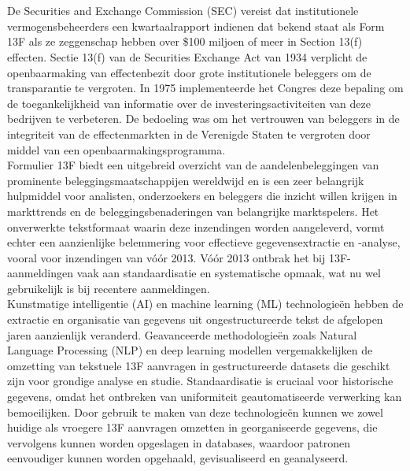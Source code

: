 \chapter{}%
\label{ch:stand-van-zaken}



De Securities and Exchange Commission (SEC) vereist dat institutionele vermogensbeheerders een kwartaalrapport indienen dat bekend staat als Form 13F als ze zeggenschap hebben over \$100 miljoen of meer in Section 13(f) effecten. Sectie 13(f) van de Securities Exchange Act van 1934 verplicht de openbaarmaking van effectenbezit door grote institutionele beleggers om de transparantie te vergroten. In 1975 implementeerde het Congres deze bepaling om de toegankelijkheid van informatie over de investeringsactiviteiten van deze bedrijven te verbeteren. De bedoeling was om het vertrouwen van beleggers in de integriteit van de effectenmarkten in de Verenigde Staten te vergroten door middel van een openbaarmakingsprogramma\autocite{SECform13F2024}.\\
Formulier 13F biedt een uitgebreid overzicht van de aandelenbeleggingen van prominente beleggingsmaatschappijen wereldwijd en is een zeer belangrijk hulpmiddel voor analisten, onderzoekers en beleggers die inzicht willen krijgen in markttrends en de beleggingsbenaderingen van belangrijke marktspelers. Het onverwerkte tekstformaat waarin deze inzendingen worden aangeleverd, vormt echter een aanzienlijke belemmering voor effectieve gegevensextractie en -analyse, vooral voor inzendingen van vóór 2013. Vóór 2013 ontbrak het bij 13F-aanmeldingen vaak aan standaardisatie en systematische opmaak, wat nu wel gebruikelijk is bij recentere aanmeldingen.\\
Kunstmatige intelligentie (AI) en machine learning (ML) technologieën hebben de extractie en organisatie van gegevens uit ongestructureerde tekst de afgelopen jaren aanzienlijk veranderd. Geavanceerde methodologieën zoals Natural Language Processing (NLP) en deep learning modellen vergemakkelijken de omzetting van tekstuele 13F aanvragen in gestructureerde datasets die geschikt zijn voor grondige analyse en studie. Standaardisatie is cruciaal voor historische gegevens, omdat het ontbreken van uniformiteit geautomatiseerde verwerking kan bemoeilijken. Door gebruik te maken van deze technologieën kunnen we zowel huidige als vroegere 13F aanvragen omzetten in georganiseerde gegevens, die vervolgens kunnen worden opgeslagen in databases, waardoor patronen eenvoudiger kunnen worden opgehaald, gevisualiseerd en geanalyseerd.\\
